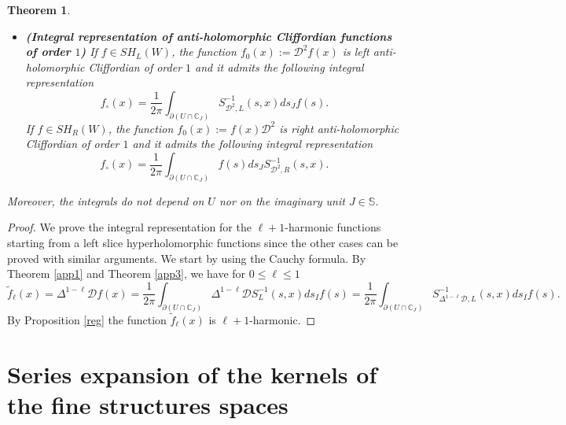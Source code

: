 \documentclass[reqno,11pt]{amsart}
\numberwithin{equation}{section}
\newcommand{\bigD}{\mathcal{D}}
\newtheorem{theorem}{Theorem}[section]
\theoremstyle{definition}
\begin{document}
\begin{theorem}
\begin{itemize}
 {\bf(Integral representation of polyanalytic functions of order $3- \ell$, $0\leq \ell\leq 1$ )} If $f \in SH_L(W)$, the function $ \breve{f}_\ell(x):=\Delta^\ell \overline{\mathcal{D}}^{2-\ell}f(x)$ is left polyanalytic of order $3-\ell$ for $0\leq \ell\leq 1$ and it admits the following integral representation
		$$ \breve{f}_\ell(x)= \frac{1}{2\pi} \int_{\partial(U \cap \mathbb{C}_J)} S^{-1}_{\Delta^\ell \overline{\mathcal{D}}^{2-\ell},L}(s,x) ds_J f(s).$$
		If $f \in SH_R(W)$, the function $ \breve{f}_\ell(x):=f(x)\Delta^\ell \overline{\mathcal{D}}^{2-\ell}$ is right polyanalytic of order $3-\ell$ for $0\leq \ell\leq 1$ and it admits the following integral representation
		$$ \breve{f}_\ell(x)= \frac{1}{2\pi} \int_{\partial(U \cap \mathbb{C}_J)} f(s) ds_J  S^{-1}_{\Delta^\ell\overline{\mathcal D}^{2-\ell},R}(s,x).$$
		\item
 {\bf(Integral representation of anti-holomorphic Cliffordian functions of order $1$)}
  If $f \in SH_L(W)$, the function $ f_0 (x):=\bigD^2 f(x)$ is left anti-holomorphic Cliffordian of order $1$ and it admits the following integral representation
		$$f_{\circ}(x)=\frac{1}{2\pi} \int_{\partial(U \cap \mathbb{C}_J)} S^{-1}_{\bigD^2, L}(s,x)ds_J f(s).$$
		If $f \in SH_R(W)$, the function $ f_0(x):= f(x)\bigD^2$ is right anti-holomorphic Cliffordian of order $1$ and it admits the following integral representation
		$$ f_{\circ}(x)=\frac{1}{2\pi} \int_{\partial(U \cap \mathbb{C}_J)} f(s) ds_J S^{-1}_{\bigD^2, R}(s,x) .$$
	\end{itemize}
	Moreover, the integrals do not depend on $U$ nor on the imaginary unit $J \in \mathbb{S}$.
\end{theorem}
\begin{proof}
	We prove the integral representation for the $\ell+1$-harmonic functions starting from a left slice hyperholomorphic functions since the other cases can be proved with similar arguments. We start by using the Cauchy formula. By Theorem \ref{app1} and Theorem \ref{app3}, we have for $0\leq \ell\leq 1$
	$$ \tilde{f}_\ell(x)=\Delta^{1-\ell}\mathcal{D}f(x)= \frac{1}{2 \pi} \int_{\partial (U \cap \mathbb{C}_J)} \Delta^{1-\ell}\mathcal{D} S^{-1}_L(s,x) ds_I f(s)= \frac{1}{2\pi}\int_{\partial (U \cap \mathbb{C}_J)} S^{-1}_{\Delta^{1-\ell}\mathcal D,L}(s,x) ds_I f(s).$$
	By Proposition \ref{reg} the function $\tilde{f}_\ell(x)$ is $\ell+1$-harmonic.
\end{proof}


\section{Series expansion of the kernels of the fine structures spaces}\label{serieskernels}
\end{document}
